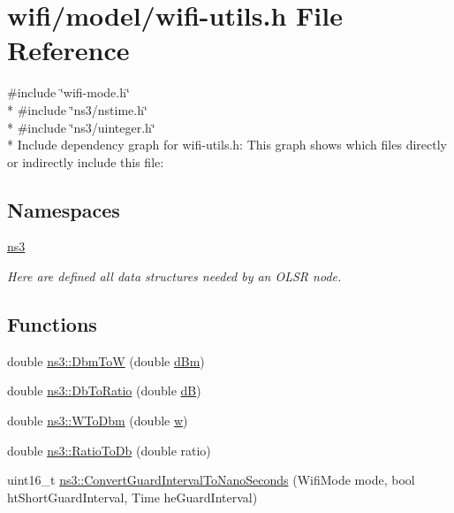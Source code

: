 \hypertarget{wifi-utils_8h}{}\section{wifi/model/wifi-\/utils.h File Reference}
\label{wifi-utils_8h}
{\ttfamily \#include \char`\"{}wifi-\/mode.\+h\char`\"{}}\\*
{\ttfamily \#include \char`\"{}ns3/nstime.\+h\char`\"{}}\\*
{\ttfamily \#include \char`\"{}ns3/uinteger.\+h\char`\"{}}\\*
Include dependency graph for wifi-\/utils.h\+:
This graph shows which files directly or indirectly include this file\+:
\subsection*{Namespaces}
\begin{DoxyCompactItemize}
\item 
 \hyperlink{namespacens3}{ns3}
\begin{DoxyCompactList}\small\item\em Here are defined all data structures needed by an O\+L\+SR node. \end{DoxyCompactList}\end{DoxyCompactItemize}
\subsection*{Functions}
\begin{DoxyCompactItemize}
\item 
double \hyperlink{namespacens3_a0a3361f0554b892e3c6389256f5429b7}{ns3\+::\+Dbm\+ToW} (double \hyperlink{generate__test__data__lte__sinr_8m_a29e3c5e60f31e36ecdfd7ad769baea1c}{d\+Bm})
\item 
double \hyperlink{namespacens3_a9bcb737f8802285d6bf0581ce1812afd}{ns3\+::\+Db\+To\+Ratio} (double \hyperlink{generate__test__data__lte__sinr_8m_ab8229e1234ec53128596ce427e8cadf2}{dB})
\item 
double \hyperlink{namespacens3_a256abf4ba6bab6e20f8419fff00e73e2}{ns3\+::\+W\+To\+Dbm} (double \hyperlink{mmwave_2model_2fading-traces_2fading__trace__generator_8m_afd61ec66f9d7b807eece6eb12c781844}{w})
\item 
double \hyperlink{namespacens3_a132cf27eedb5e15a1427faf8724be4d2}{ns3\+::\+Ratio\+To\+Db} (double ratio)
\item 
uint16\+\_\+t \hyperlink{namespacens3_a55676b01ef86544fd12cc854f9a32b2b}{ns3\+::\+Convert\+Guard\+Interval\+To\+Nano\+Seconds} (Wifi\+Mode mode, bool ht\+Short\+Guard\+Interval, Time he\+Guard\+Interval)
\end{DoxyCompactItemize}
